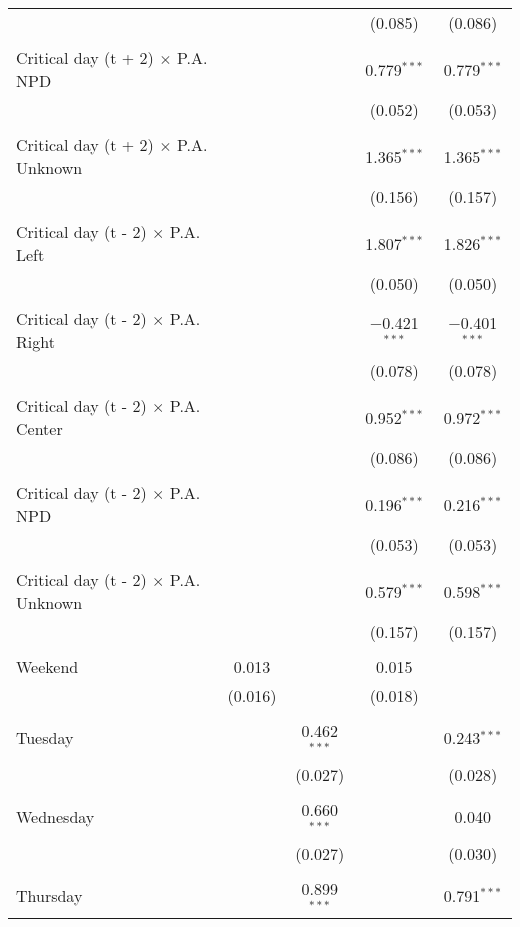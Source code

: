 \documentclass[
]{article}
\begin{document}
\begin{table}[!htbp]
{\begin{tabular}{@{\extracolsep{5pt}}lcccc}
  &  &  & (0.085) & (0.086) \\ 
  & & & & \\ 
 Critical day (t + 2) $\times$ P.A. NPD &  &  & 0.779$^{***}$ & 0.779$^{***}$ \\ 
  &  &  & (0.052) & (0.053) \\ 
  & & & & \\ 
 Critical day (t + 2) $\times$ P.A. Unknown &  &  & 1.365$^{***}$ & 1.365$^{***}$ \\ 
  &  &  & (0.156) & (0.157) \\ 
  & & & & \\ 
 Critical day (t - 2) $\times$ P.A. Left &  &  & 1.807$^{***}$ & 1.826$^{***}$ \\ 
  &  &  & (0.050) & (0.050) \\ 
  & & & & \\ 
 Critical day (t - 2) $\times$ P.A. Right &  &  & $-$0.421$^{***}$ & $-$0.401$^{***}$ \\ 
  &  &  & (0.078) & (0.078) \\ 
  & & & & \\ 
 Critical day (t - 2) $\times$ P.A. Center &  &  & 0.952$^{***}$ & 0.972$^{***}$ \\ 
  &  &  & (0.086) & (0.086) \\ 
  & & & & \\ 
 Critical day (t - 2) $\times$ P.A. NPD &  &  & 0.196$^{***}$ & 0.216$^{***}$ \\ 
  &  &  & (0.053) & (0.053) \\ 
  & & & & \\ 
 Critical day (t - 2) $\times$ P.A. Unknown &  &  & 0.579$^{***}$ & 0.598$^{***}$ \\ 
  &  &  & (0.157) & (0.157) \\ 
  & & & & \\ 
 Weekend & 0.013 &  & 0.015 &  \\ 
  & (0.016) &  & (0.018) &  \\ 
  & & & & \\ 
 Tuesday &  & 0.462$^{***}$ &  & 0.243$^{***}$ \\ 
  &  & (0.027) &  & (0.028) \\ 
  & & & & \\ 
 Wednesday &  & 0.660$^{***}$ &  & 0.040 \\ 
  &  & (0.027) &  & (0.030) \\ 
  & & & & \\ 
 Thursday &  & 0.899$^{***}$ &  & 0.791$^{***}$ \\ 

\end{tabular}}
\end{table}
\end{document}
